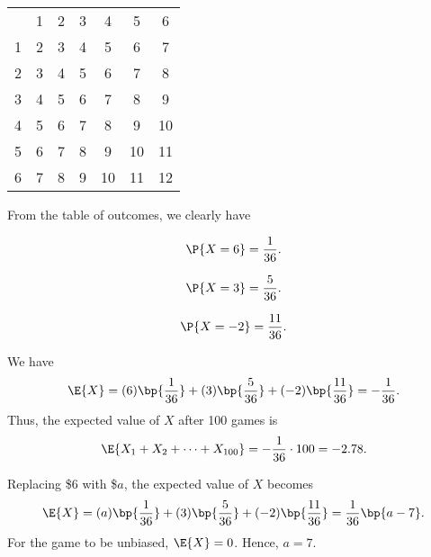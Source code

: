 \begin{solution}
    \begin{ppart}
        \begin{table}[H]
            \centering
            \begin{tabular}{ccccccc}
            & 1 & 2 & 3  & 4 & 5 & 6  \\ \cline{2-7} 
            \multicolumn{1}{c|}{1} & 2 & 3 & 4 & 5 & 6 & 7  \\
            \multicolumn{1}{c|}{2} & 3 & 4 & 5 & 6 & 7 & 8 \\
            \multicolumn{1}{c|}{3} & 4 & 5 & 6 & 7 & 8 & 9\\
            \multicolumn{1}{c|}{4} & 5 & 6 & 7 & 8 & 9 & 10\\
            \multicolumn{1}{c|}{5} & 6 & 7 & 8 & 9 & 10 & 11\\
            \multicolumn{1}{c|}{6} & 7 & 8 & 9 & 10 & 11 & 12\\
            \end{tabular}
        \end{table}

        From the table of outcomes, we clearly have
        \begin{psubpart}
            \[\P{X = 6} = \frac1{36}.\]
        \end{psubpart}
        \begin{psubpart}
            \[\P{X = 3} = \frac{5}{36}.\]
        \end{psubpart}
        \begin{psubpart}
            \[\P{X = -2} = \frac{11}{36}.\]    
        \end{psubpart}
    \end{ppart}
    \begin{ppart}
        We have \[\E{X} = (6)\bp{\frac1{36}} + (3)\bp{\frac5{36}} + (-2)\bp{\frac{11}{36}} = -\frac1{36}.\] Thus, the expected value of $X$ after 100 games is \[\E{X_1 + X_2 + \dots + X_{100}} = -\frac1{36} \cdot 100 = -2.78.\]
    \end{ppart}
    \begin{ppart}
        Replacing \$6 with \$$a$, the expected value of $X$ becomes \[\E{X} = (a)\bp{\frac1{36}} + (3)\bp{\frac5{36}} + (-2)\bp{\frac{11}{36}} = \frac1{36} \bp{a - 7}.\] For the game to be unbiased, $\E{X} = 0$. Hence, $a = 7$.
    \end{ppart}
\end{solution}


